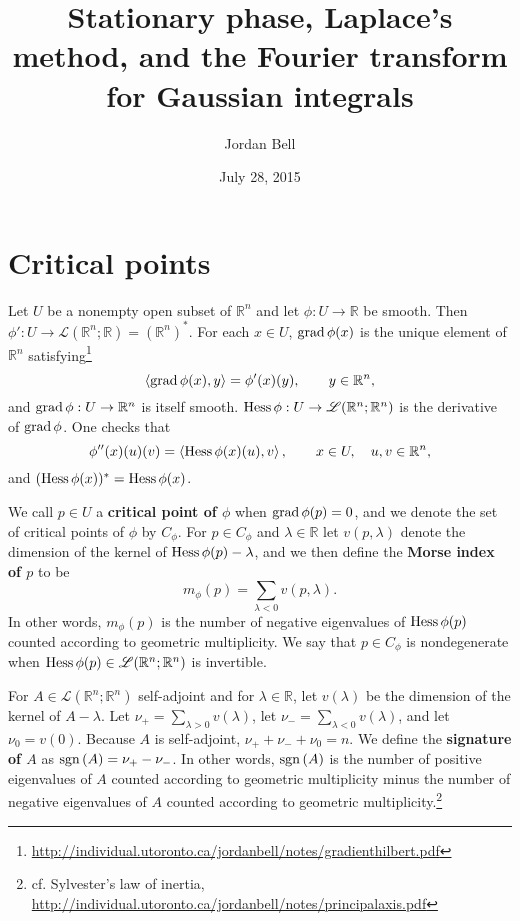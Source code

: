 \documentclass{article}
\newcommand{\inner}[2]{\left\langle #1, #2 \right\rangle}
\newcommand{\grad}{\ensuremath\mathrm{grad}\,}
\newcommand{\Hess}{\ensuremath\mathrm{Hess}\,}
\newcommand{\sgn}{\ensuremath\mathrm{sgn}\,}
\theoremstyle{definition}
\begin{document}
\title{Stationary phase,  Laplace's method, and the Fourier transform for Gaussian integrals}
\author{Jordan Bell}
\date{July 28, 2015}

\maketitle

\section{Critical points}
Let $U$ be a nonempty open subset of $\mathbb{R}^n$ and let
 $\phi:U \to \mathbb{R}$ be smooth. Then $\phi':U \to \mathscr{L}(\mathbb{R}^n;\mathbb{R})
=(\mathbb{R}^n)^*$. 
For each $x \in U$, $\grad \phi(x)$ is the unique element of $\mathbb{R}^n$ satisfying\footnote{\url{http://individual.utoronto.ca/jordanbell/notes/gradienthilbert.pdf}}
\[
\inner{\grad \phi(x)}{y} = \phi'(x)(y),\qquad y\in \mathbb{R}^n,
\]
and $\grad \phi:U \to \mathbb{R}^n$ is itself smooth. 
$\Hess \phi:U \to \mathscr{L}(\mathbb{R}^n;\mathbb{R}^n)$ is the derivative of $\grad \phi$. One checks that
\[
\phi''(x)(u)(v) = \inner{\Hess \phi(x)(u)}{v},\qquad x \in U,\quad u,v \in \mathbb{R}^n,
\]
and $(\Hess \phi (x))^*=\Hess \phi (x)$. 

We call $p \in U$ a \textbf{critical point of $\phi$} when $\grad \phi(p)=0$, and we denote the
set of critical points of $\phi$ by $C_\phi$. 
For $p \in C_\phi$ and $\lambda \in \mathbb{R}$ let 
$v(p,\lambda)$ denote the dimension of the kernel of
$\Hess \phi(p) - \lambda$, and we then define the \textbf{Morse index of $p$} to be
\[
m_\phi(p) = \sum_{\lambda<0} v(p,\lambda).
\]
In other words, $m_\phi(p)$ is the number of negative eigenvalues of $\Hess \phi(p)$ counted according
to geometric multiplicity. 
We say that $p \in C_\phi$ is
nondegenerate when
$\Hess \phi(p) \in \mathscr{L}(\mathbb{R}^n;\mathbb{R}^n)$ is invertible.

For $A \in \mathscr{L}(\mathbb{R}^n;\mathbb{R}^n)$  self-adjoint and for $\lambda \in \mathbb{R}$,
let
$v(\lambda)$ be the dimension of
the kernel of $A-\lambda$. Let $\nu_+=\sum_{\lambda>0} v(\lambda)$,  let
$\nu_-=\sum_{\lambda<0} v(\lambda)$, and  let $\nu_0=v(0)$. 
Because $A$ is self-adjoint,
$\nu_+ + \nu_- + \nu_0=n$. 
We define
the \textbf{signature of $A$} as  $\sgn(A)=\nu_+-\nu_-$. In other words, 
$\sgn(A)$ is the number of positive eigenvalues of $A$ counted according to geometric
 multiplicity minus the number of negative
eigenvalues of $A$ counted according to geometric multiplicity.\footnote{cf. Sylvester's law of inertia, \url{http://individual.utoronto.ca/jordanbell/notes/principalaxis.pdf}}
\end{document}
